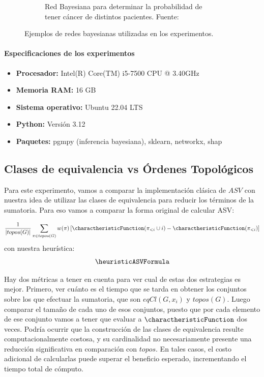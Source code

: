 \begin{figure}[ht]
\begin{subfigure}[b]{0.6\textwidth}
        \caption{Red Bayesiana para determinar la probabilidad de tener cáncer de distintos pacientes. Fuente: \cite{childNetwork}}
        \label{fig:child_network}
    \end{subfigure}

    \caption{Ejemplos de redes bayesianas utilizadas en los experimentos.}
    \label{fig:bayesian_networks_combined}
\end{figure}

\paragraph{Especificaciones de los experimentos}

\begin{itemize}
    \item \textbf{Procesador:} Intel(R) Core(TM) i5-7500 CPU @ 3.40GHz
    \item \textbf{Memoria RAM:} 16 GB
    \item \textbf{Sistema operativo:} Ubuntu 22.04 LTS
    \item \textbf{Python:} Versión 3.12
    \item  \textbf{Paquetes:} pgmpy (inferencia bayesiana), sklearn, networkx, shap
\end{itemize}

\subsection{Clases de equivalencia vs Órdenes Topológicos}

Para este experimento, vamos a comparar la implementación clásica de $ASV$ con nuestra idea de utilizar las clases de equivalencia para reducir los términos de la sumatoria. Para eso vamos a comparar la forma original de calcular ASV: 

$$\frac{1}{|topos(G)|} \sum_{\pi \in topos(G)} w(\pi) \left[ \charactheristicFunction(\pi_{<i} \cup {i}) - \charactheristicFunction(\pi_{<i}) \right] $$
con nuestra heurística:
$$\heuristicASVFormula$$

Hay dos métricas a tener en cuenta para ver cual de estas dos estrategias es mejor. Primero, ver cuánto es el tiempo que se tarda en obtener los conjuntos sobre los que efectuar la sumatoria, que son $eqCl(G, x_i)$ y $topos(G)$. Luego comparar el tamaño de cada uno de esos conjuntos, puesto que por cada elemento de ese conjunto vamos a tener que evaluar a $\charactheristicFunction$ dos veces. Podría ocurrir que la construcción de las clases de equivalencia resulte computacionalmente costosa, y su cardinalidad no necesariamente presente una reducción significativa en comparación con $topos$. En tales casos, el costo adicional de calcularlas puede superar el beneficio esperado, incrementando el tiempo total de cómputo.

